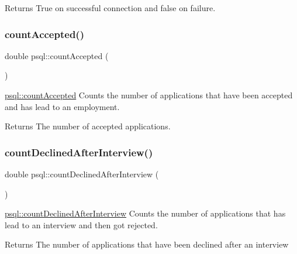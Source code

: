 \begin{DoxyReturn}{Returns}
True on successful connection and false on failure. 
\end{DoxyReturn}
\mbox{\label{classpsql_a0beec2f098edc0961f27774cdd54d09b}} 
\subsubsection{\texorpdfstring{count\+Accepted()}{countAccepted()}}
{\footnotesize\ttfamily double psql\+::count\+Accepted (\begin{DoxyParamCaption}{ }\end{DoxyParamCaption})}



\mbox{\hyperlink{classpsql_a0beec2f098edc0961f27774cdd54d09b}{psql\+::count\+Accepted}} Counts the number of applications that have been accepted and has lead to an employment. 

\begin{DoxyReturn}{Returns}
The number of accepted applications. 
\end{DoxyReturn}
\mbox{\label{classpsql_a2ae512bc231446d5fccae84582395675}} 
\subsubsection{\texorpdfstring{count\+Declined\+After\+Interview()}{countDeclinedAfterInterview()}}
{\footnotesize\ttfamily double psql\+::count\+Declined\+After\+Interview (\begin{DoxyParamCaption}{ }\end{DoxyParamCaption})}



\mbox{\hyperlink{classpsql_a2ae512bc231446d5fccae84582395675}{psql\+::count\+Declined\+After\+Interview}} Counts the number of applications that has lead to an interview and then got rejected. 

\begin{DoxyReturn}{Returns}
The number of applications that have been declined after an interview 
\end{DoxyReturn}
\mbox{\label{classpsql_a40541367c3af9c0ac94e2fb92f00f53c}} 
